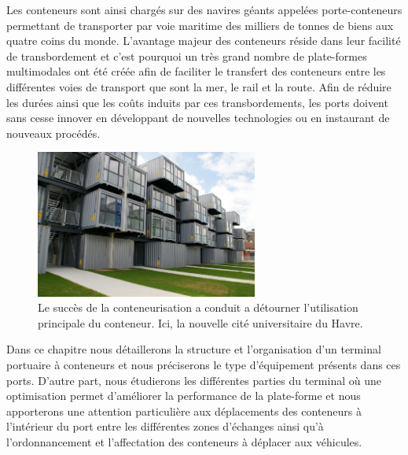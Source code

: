 Les conteneurs sont ainsi chargés sur des navires géants appelées porte-conteneurs permettant de transporter par voie maritime des milliers de tonnes de biens aux quatre coins du monde. L'avantage majeur des conteneurs réside dans leur facilité de transbordement et c'est pourquoi un très grand nombre de plate-formes multimodales ont été créée afin de faciliter le transfert des conteneurs entre les différentes voies de transport que sont la mer, le rail et la route. Afin de réduire les durées ainsi que les coûts induits par ces transbordements, les ports doivent sans cesse innover en développant de nouvelles technologies ou en instaurant de nouveaux procédés.\\

\begin{figure}
 \begin{center}
  \includegraphics[width=0.65\textwidth]{chapitres/application/citeUConteneurs.jpg}
  \caption{Le succès de la conteneurisation a conduit a détourner l'utilisation principale du conteneur. Ici, la nouvelle cité universitaire du Havre.}
 \end{center}
\end{figure}

Dans ce chapitre nous détaillerons la structure et l'organisation d'un terminal portuaire à conteneurs et nous préciserons le type d'équipement présents dans ces ports. D'autre part, nous étudierons les différentes parties du terminal où une optimisation permet d'améliorer la performance de la plate-forme et nous apporterons une attention particulière aux déplacements des conteneurs à l'intérieur du port entre les différentes zones d'échanges ainsi qu'à l'ordonnancement et l'affectation des conteneurs à déplacer aux véhicules.